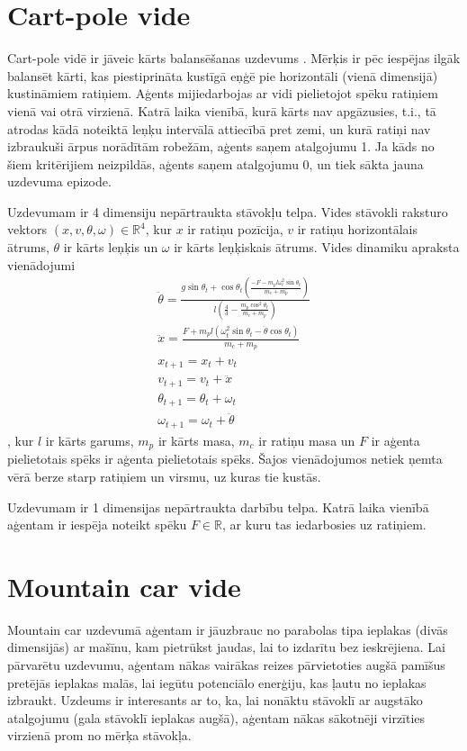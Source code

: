 \documentclass{ludis} %
\begin{document}
\section{Cart-pole vide}
Cart-pole vidē ir jāveic kārts balansēšanas uzdevums \autocite{Barto}. Mērķis ir
pēc iespējas ilgāk balansēt kārti, kas piestiprināta kustīgā eņģē pie
horizontāli (vienā dimensijā) kustināmiem ratiņiem. Aģents mijiedarbojas ar vidi
pielietojot spēku ratiņiem vienā vai otrā virzienā. Katrā laika vienībā, kurā
kārts nav apgāzusies, t.i., tā atrodas kādā noteiktā leņķu intervālā attiecībā
pret zemi, un kurā ratiņi nav izbraukuši ārpus norādītām robežām, aģents saņem
atalgojumu 1. Ja kāds no šiem kritērijiem neizpildās, aģents saņem atalgojumu 0,
un tiek sākta jauna uzdevuma epizode.

Uzdevumam ir 4 dimensiju nepārtraukta stāvokļu telpa. Vides stāvokli raksturo
vektors $(x, v, \theta, \omega) \in \mathbb{R}^4$, kur $x$ ir ratiņu pozīcija,
$v$ ir ratiņu horizontālais ātrums, $\theta$ ir kārts leņķis un $\omega$ ir
kārts leņķiskais ātrums. Vides dinamiku apraksta vienādojumi
\begin{gather}
  \ddot{\theta} = \frac{g \sin\theta_t + \cos\theta_t \left(\frac{-F - m_p l \omega_t^2\sin\theta_t}
                                                         {m_c + m_p}\right)}
                        {l \left(\frac{4}{3} - \frac{m_p\cos^2\theta_t}
                                               {m_c + m_p}\right)} \\ 
  \ddot{x} = \frac{F + m_p l \left(\omega_t^2\sin\theta_t - \ddot{\theta}\cos\theta_t\right)}
                   {m_c + m_p} \\
  x_{t+1} = x_t + v_t \\
  v_{t+1} = v_t + \ddot{x} \\
  \theta_{t+1} = \theta_t + \omega_t \\
  \omega_{t+1} = \omega_t + \ddot{\theta}
\end{gather},
kur $l$ ir kārts garums, $m_p$ ir kārts masa, $m_c$ ir ratiņu masa un $F$ ir
aģenta pielietotais spēks ir aģenta pielietotais spēks. Šajos vienādojumos
netiek ņemta vērā berze starp ratiņiem un virsmu, uz kuras tie kustās.

Uzdevumam ir 1 dimensijas nepārtraukta darbību telpa. Katrā laika vienībā
aģentam ir iespēja noteikt spēku $F \in \mathbb{R}$, ar kuru tas iedarbosies uz
ratiņiem.

\section{Mountain car vide}
Mountain car uzdevumā aģentam ir jāuzbrauc no parabolas tipa ieplakas (divās
dimensijās) ar mašīnu, kam pietrūkst jaudas, lai to izdarītu bez ieskrējiena.
Lai pārvarētu uzdevumu, aģentam nākas vairākas reizes pārvietoties augšā
pamīšus pretējās ieplakas malās, lai iegūtu potenciālo enerģiju, kas ļautu no
ieplakas izbraukt. Uzdeums ir interesants ar to, ka, lai nonāktu stāvoklī ar
augstāko atalgojumu (gala stāvoklī ieplakas augšā), aģentam nākas sākotnēji
virzīties virzienā prom no mērķa stāvokļa.
\end{document}
